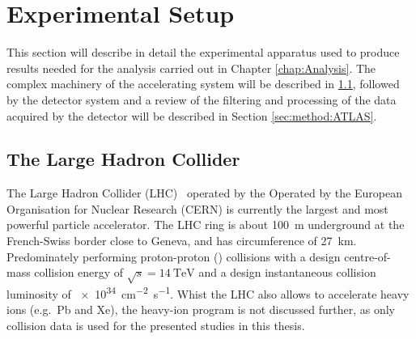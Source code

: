 \chapter{Experimental Setup}\label{chap:expSetup}
This section will describe in detail the experimental apparatus used to produce results needed for the analysis carried out in Chapter \cref{chap:Analysis}. 
The complex machinery of the accelerating system will be described in \cref{sec:method:LHC}, followed by the detector system and a review of the filtering and processing of the data acquired by the detector will be described in Section \ref{sec:method:ATLAS}.

\section{The Large Hadron Collider}\label{sec:method:LHC}
The Large Hadron Collider (LHC)~\cite{LHC} operated by the Operated by the European Organisation for Nuclear Research (CERN) is currently the largest and most powerful particle accelerator. 
The LHC ring is about \SI{100}{\metre} underground at the French-Swiss border close to Geneva, and has circumference of \SI{27}{\kilo\metre}.
Predominately performing proton-proton (\protonproton) collisions with a design centre-of-mass collision energy of $\sqrt{s} = \SI{14}{\tera\electronvolt}$ and a design instantaneous collision luminosity of \SI{e34}{\centi\metre^{-2} \second^{-1}}.
Whist the LHC also allows to accelerate heavy ions (e.g.\ Pb and Xe), the heavy-ion program is not discussed further, as only \protonproton collision data is used for the presented studies in this thesis. 

